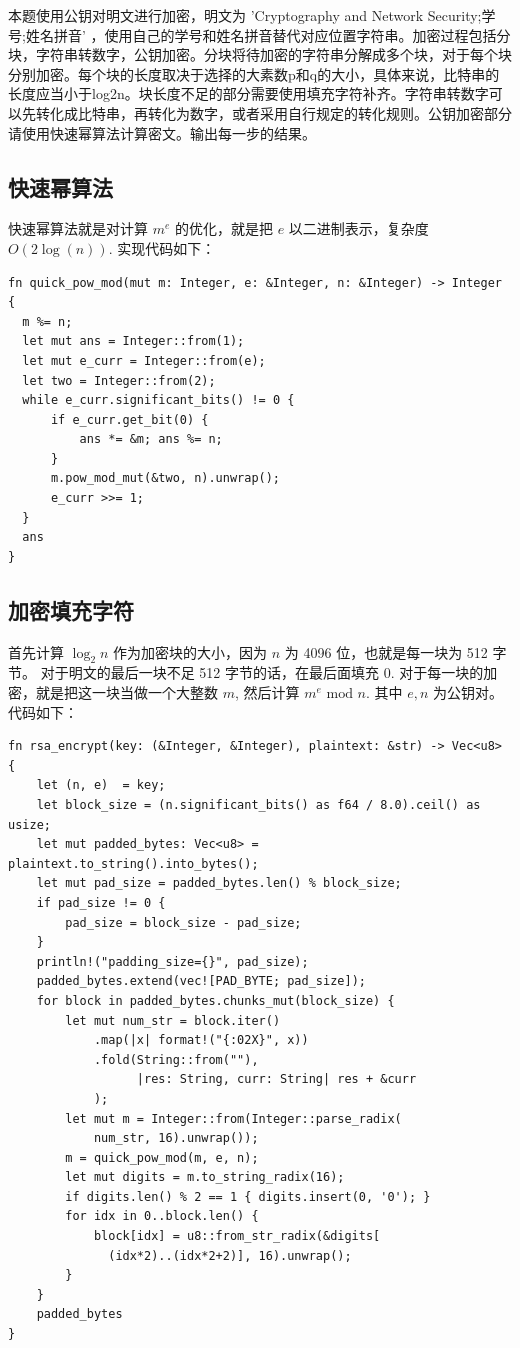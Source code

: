 \documentclass[degree=project,degree-type=project,cjk-font=windows]{thuthesis}
\begin{document}
本题使用公钥对明文进行加密，明文为 'Cryptography and Network Security;学号;姓名拼音' ，使用自己的学号和姓名拼音替代对应位置字符串。加密过程包括分块，字符串转数字，公钥加密。分块将待加密的字符串分解成多个块，对于每个块分别加密。每个块的长度取决于选择的大素数p和q的大小，具体来说，比特串的长度应当小于log2n。块长度不足的部分需要使用填充字符补齐。字符串转数字可以先转化成比特串，再转化为数字，或者采用自行规定的转化规则。公钥加密部分请使用快速幂算法计算密文。输出每一步的结果。

\subsection{快速幂算法}
快速幂算法就是对计算 $m^e$ 的优化，就是把 $e$ 以二进制表示，复杂度 $O(2\log(n))$.
实现代码如下：

  \begin{verbatim}
fn quick_pow_mod(mut m: Integer, e: &Integer, n: &Integer) -> Integer {
  m %= n;
  let mut ans = Integer::from(1);
  let mut e_curr = Integer::from(e);
  let two = Integer::from(2);
  while e_curr.significant_bits() != 0 {
      if e_curr.get_bit(0) {
          ans *= &m; ans %= n;
      }
      m.pow_mod_mut(&two, n).unwrap();
      e_curr >>= 1;
  }
  ans
}
  \end{verbatim}

\subsection{加密填充字符}

首先计算 $\log_2 n$ 作为加密块的大小，因为 $n$ 为 4096 位，也就是每一块为 512 字节。
对于明文的最后一块不足 512 字节的话，在最后面填充 0.
对于每一块的加密，就是把这一块当做一个大整数 $m$, 然后计算 $m^e \text{ mod } n$.
其中 $e, n$ 为公钥对。
代码如下：

  \begin{verbatim}
fn rsa_encrypt(key: (&Integer, &Integer), plaintext: &str) -> Vec<u8> {
    let (n, e)  = key;
    let block_size = (n.significant_bits() as f64 / 8.0).ceil() as usize;
    let mut padded_bytes: Vec<u8> = plaintext.to_string().into_bytes();
    let mut pad_size = padded_bytes.len() % block_size;
    if pad_size != 0 {
        pad_size = block_size - pad_size;
    }
    println!("padding_size={}", pad_size);
    padded_bytes.extend(vec![PAD_BYTE; pad_size]);
    for block in padded_bytes.chunks_mut(block_size) {
        let mut num_str = block.iter()
            .map(|x| format!("{:02X}", x))
            .fold(String::from(""),
                  |res: String, curr: String| res + &curr
            );
        let mut m = Integer::from(Integer::parse_radix(
            num_str, 16).unwrap());
        m = quick_pow_mod(m, e, n);
        let mut digits = m.to_string_radix(16);
        if digits.len() % 2 == 1 { digits.insert(0, '0'); }
        for idx in 0..block.len() {
            block[idx] = u8::from_str_radix(&digits[
              (idx*2)..(idx*2+2)], 16).unwrap();
        }
    }
    padded_bytes
}
\end{verbatim}
\end{document}
